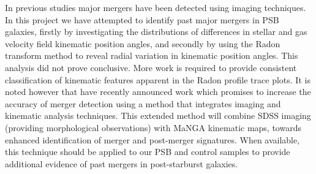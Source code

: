 In previous studies major mergers have been detected using imaging techniques. In this project we have attempted to identify past major mergers in PSB galaxies, firstly by investigating the distributions of differences in stellar and gas velocity field kinematic position angles, and secondly by using the Radon transform method to reveal radial variation in kinematic position angles. This analysis did not prove conclusive. More work is required to provide consistent classification of kinematic features apparent in the Radon profile trace plots. It is noted however that \cite{2019DDA....5020304N} have recently announced work which promises to increase the accuracy of merger detection using a method that integrates imaging and kinematic analysis techniques. This extended method will combine SDSS imaging (providing morphological observations) with MaNGA  kinematic maps, towards enhanced identification of merger and post-merger signatures. When available, this technique should be applied to our PSB and control samples to provide additional evidence of past mergers in post-starburst galaxies.
